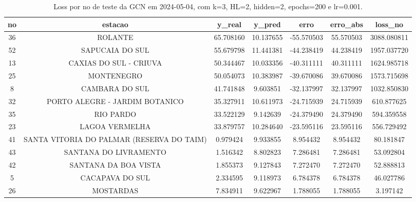 \begin{table}[h]
\centering
\caption{Loss por no de teste da GCN em 2024-05-04, com k=3, HL=2, hidden=2, epochs=200 e lr=0.001.}
\label{tab:gcn_loss_k3_hl2_h2_e200_d20240504}
\begin{tabular}{ccccccc}
\toprule
no & estacao & y\_real & y\_pred & erro & erro\_abs & loss\_no \\
\midrule
36 & ROLANTE & 65.708160 & 10.137655 & -55.570503 & 55.570503 & 3088.080811 \\
52 & SAPUCAIA DO SUL & 55.679798 & 11.441381 & -44.238419 & 44.238419 & 1957.037720 \\
13 & CAXIAS DO SUL - CRIUVA & 50.344467 & 10.033356 & -40.311111 & 40.311111 & 1624.985718 \\
25 & MONTENEGRO & 50.054073 & 10.383987 & -39.670086 & 39.670086 & 1573.715698 \\
8 & CAMBARA DO SUL & 41.741848 & 9.603851 & -32.137997 & 32.137997 & 1032.850830 \\
32 & PORTO ALEGRE - JARDIM BOTANICO & 35.327911 & 10.611973 & -24.715939 & 24.715939 & 610.877625 \\
35 & RIO PARDO & 33.522129 & 9.142639 & -24.379490 & 24.379490 & 594.359558 \\
23 & LAGOA VERMELHA & 33.879757 & 10.284640 & -23.595116 & 23.595116 & 556.729492 \\
41 & SANTA VITORIA DO PALMAR (RESERVA DO TAIM) & 0.979424 & 9.933855 & 8.954432 & 8.954432 & 80.181847 \\
43 & SANTANA DO LIVRAMENTO & 1.516342 & 8.802823 & 7.286481 & 7.286481 & 53.092804 \\
42 & SANTANA DA BOA VISTA & 1.855373 & 9.127843 & 7.272470 & 7.272470 & 52.888813 \\
5 & CACAPAVA DO SUL & 2.334595 & 9.118973 & 6.784378 & 6.784378 & 46.027786 \\
26 & MOSTARDAS & 7.834911 & 9.622967 & 1.788055 & 1.788055 & 3.197142 \\
\bottomrule
\end{tabular}
\end{table}
